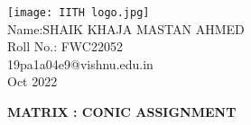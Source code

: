 \documentclass[10pt,a4paper]{report}
\begin{document}
\begin{multicols}{2}
\raggedright {\texttt{[image: IITH logo.jpg]}} \vspace{3mm}\\ \raggedleft Name:SHAIK KHAJA MASTAN AHMED\vspace{2mm}\\ 
\raggedleft Roll No.: FWC22052\vspace{2mm}\\ 
\raggedleft 19pa1a04e9@vishnu.edu.in \vspace{2mm}\\ 
\raggedleft Oct 2022 \vspace{5mm}\\
\end{multicols}

\centering \Large \textbf{MATRIX : CONIC ASSIGNMENT} \normalsize \vspace{10mm}
\end{document}
